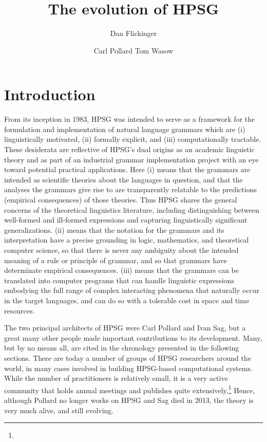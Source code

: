 \documentclass[output=paper
 	        ,biblatex
                ,babelshorthands
                ,newtxmath
                ,draftmode
                ,colorlinks, citecolor=brown
]{langscibook}
\title{The evolution of HPSG}
\author{%
	Dan Flickinger\affiliation{Stanford University}%
	\and Carl Pollard\affiliation{Ohio State Universitiy}
	\lastand Tom Wasow\affiliation{Stanford University}%
}
\begin{document}
\maketitle
\label{chap-evolution}


\section{Introduction} 

From its inception in 1983, HPSG was intended to serve as a framework for the formulation and implementation of natural language grammars which are (i) linguistically motivated, (ii) formally explicit, and (iii) computationally tractable. These desiderata are reflective of HPSG's dual origins as an academic linguistic theory and as part of an industrial grammar implementation project with an eye toward potential practical applications. Here (i) means that the grammars are intended as scientific theories about the languages in question, and that the analyses the grammars give rise to are transparently relatable to the predictions (empirical consequences) of those theories. Thus HPSG shares the general concerns of the theoretical linguistics literature, including distinguishing between well-formed and ill-formed expressions and capturing linguistically significant generalizations.  (ii) means that the notation for the grammars and its interpretation have a precise grounding in logic, mathematics, and theoretical computer science, so that there is never any ambiguity about the intended meaning of a rule or principle of grammar, and so that grammars have determinate empirical consequences. (iii) means that the grammars can be translated into computer programs that can handle linguistic expressions embodying the full range of complex interacting phenomena that naturally occur in the target languages, and can do so with a tolerable cost in space and time resources.

The two principal architects of HPSG were Carl Pollard and Ivan
Sag, but a great many other people made important contributions to its
development.  Many, but by no means all, are cited in the chronology presented in the following
sections.  There are today a number of groups of HPSG researchers around the world, in many cases
involved in building HPSG-based computational systems.  While the number of practitioners is
relatively small, it is a very active community that holds annual meetings and publishes quite
extensively.\footnote{} Hence, although Pollard no longer works on HPSG and Sag died in 2013, the theory
is very much alive, and still evolving.
\end{document}
